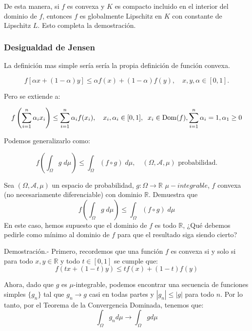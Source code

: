 \begin{paracol}{2}
{\begin{teo}
    De esta manera, si $f$ es convexa y $K$ es compacto incluido en el interior del dominio de $f$, entonces $f$ es globalmente Lipschitz en $K$ con constante de Lipschitz $L$. Esto completa la demostración.
\end{teo}
}

\subsubsection{Desigualdad de Jensen}

La definición mas simple sería sería la propia definición de función convexa.

\begin{def.}
    $$f\left[\alpha x + (1-\alpha)y\right]\leq \alpha f(x) + (1-\alpha)f(y), \quad x,y,\alpha\in[0,1].$$	
\end{def.}

Pero se extiende a:

\begin{def.}
    $$f\left(\sum_{i=1}^n\alpha_i x_i\right)\leq \sum_{i=1}^n\alpha_i f(x_i), \quad x_i,\alpha_i\in[0,1],\;\; x_i\in \mathop{\mbox{\normalfont Dom}}\nolimits(f), \sum_{i=1}^n\alpha_i=1, \alpha_1\geq 0$$
\end{def.}

Podemos generalizarlo como:

\begin{def.}
    $$f\left(\int_\Omega g\; d\mu\right)\leq \int_\Omega (f\circ g)\; d\mu,\quad (\Omega,\mathscr{A},\mu) \text{ probabilidad}.$$
\end{def.}

{\color{blue}
\begin{ejer} Sea $(\Omega,\mathscr{A},\mu)$ un espacio de probabilidad, $g:\Omega\to \mathbb{R}$ $\mu-integrable$, $f$ convexa (no necesariamente diferenciable) con dominio $\mathbb{R}$. Demuestra que
$$f\left(\int_\Omega g\; d\mu\right)\leq \int_\Omega (f\circ g)\; d\mu$$
En este caso, hemos supuesto que el dominio de $f$ es todo $\mathbb{R}$, ¿Qué debemos pedirle como mínimo al dominio de $f$ para que el resultado siga siendo cierto?

    Demostración.-\; Primero, recordemos que una función $f$ es convexa si y solo si para todo $x, y \in \mathbb{R}$ y todo $t \in [0,1]$ se cumple que:
$$f(tx + (1-t)y) \leq tf(x) + (1-t)f(y)$$

Ahora, dado que $g$ es $\mu$-integrable, podemos encontrar una secuencia de funciones simples $\{g_n\}$ tal que $g_n \to g$ casi en todas partes y $|g_n| \leq |g|$ para todo $n$. Por lo tanto, por el Teorema de la Convergencia Dominada, tenemos que:
$$\int_\Omega g_n d\mu \to \int_\Omega g d\mu$$


\end{ejer}}
\end{paracol}
